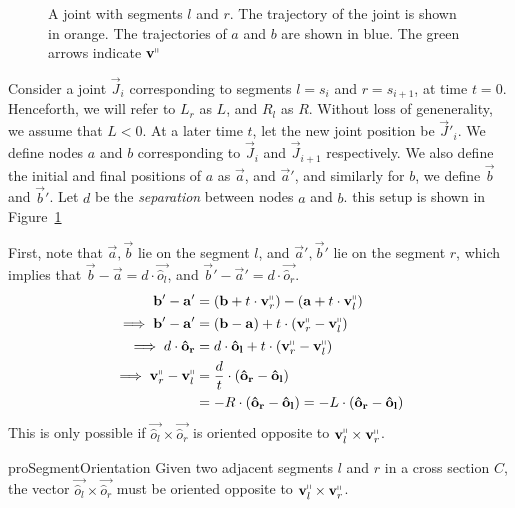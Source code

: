 \begin{figure}[htpb]
\graphicspath{{./notebooks/}}
    \centering
    \def\svgwidth{0.7\textwidth}
    
    \caption{A joint with segments $l$ and $r$.
    The trajectory of the joint is shown in orange.
    The trajectories of $a$ and $b$ are shown in blue.
    The green arrows indicate $\vec v^\shortparallel$}
    \label{fig:joint_plane_velocity}
\end{figure}

Consider a joint $\vec J_i$ corresponding to segments $l = s_i$ and $r = s_{i+1}$, at time $t=0$.
Henceforth, we will refer to $L_r$ as $L$, and $R_l$ as $R$.
Without loss of genenerality, we assume that $L<0$.
At a later time $t$, let the new joint position be $\vec J'_i$.
We define nodes $a$ and $b$ corresponding to $\vec J_i$ and $\vec J_{i+1}$ respectively.
We also define the initial and final positions of $a$ as $\vec a$,
and $\vec a'$, and similarly for $b$, we define $\vec b$ and $\vec b'$.
Let $d$ be the \emph{separation} between nodes $a$ and $b$.
this setup is shown in Figure~\ref{fig:joint_plane_velocity}


First, note that $\vec a, \vec b$ lie on the segment $l$, and $\vec a', \vec b'$ lie on the segment $r$,
which implies that $\vec b-\vec a = d\cdot \vec{\hat o_l}$, and $\vec b'-\vec a' = d\cdot \vec{\hat o_r}$.
\begin{align}
\vec b' - \vec a' &= (\vec b + t\cdot \vec v_r^\shortparallel) - (\vec a + t\cdot \vec v_l^\shortparallel)\\
\implies \vec b' - \vec a' &= (\vec b - \vec a) + t\cdot(\vec v_r^\shortparallel - \vec v_l^\shortparallel)\\
\implies d\cdot \vec{\hat o_r} &= d\cdot \vec{\hat o_l} + t\cdot(\vec v_r^\shortparallel - \vec v_l^\shortparallel)\\
\implies \vec v_r^\shortparallel - \vec v_l^\shortparallel &= \frac{d}{t}\cdot(\vec{\hat o_r}-\vec{\hat o_l})\\
&= -R\cdot(\vec{\hat o_r}-\vec{\hat o_l}) = -L\cdot(\vec{\hat o_r}-\vec{\hat o_l})
\end{align}
This is only possible if $\vec{\hat o_l}\times \vec{\hat o_r}$ is oriented opposite to $\vec v_l^\shortparallel\times \vec v_r^\shortparallel$.

\begin{restatable}{pro}{SegmentOrientation}
\label{pro:SegmentOrientation}
Given two adjacent segments $l$ and $r$ in a cross section $C$, the vector
$\vec{\hat o_l}\times \vec{\hat o_r}$ must be oriented opposite to $\vec v_l^\shortparallel\times \vec v_r^\shortparallel$.
\end{restatable}

